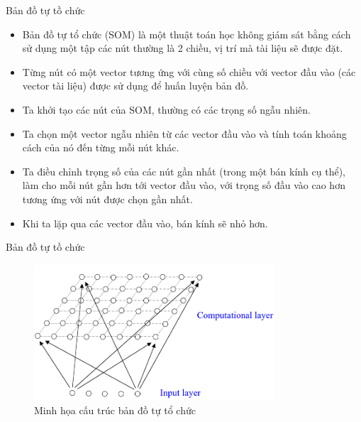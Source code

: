 \documentclass[10pt]{beamer}
\theoremstyle{remark}
\theoremstyle{definition}
\begin{document}
\begin{frame}{Bản đồ tự tồ chức}
	\begin{itemize}
		\item Bản đồ tự tổ chức (SOM) \cite{248} là một thuật toán học không giám sát bằng cách sử dụng một tập các nút thường là 2 chiều, vị trí mà tài liệu sẽ được đặt.
		\item Từng nút có một vector tương ứng với cùng số chiều với vector đầu vào (các vector tài liệu) được sử dụng để huấn luyện bản đồ.
		\item Ta khởi tạo các nút của SOM, thường có các trọng số ngẫu nhiên.
		\item Ta chọn một vector ngẫu nhiên từ các vector đầu vào và tính toán khoảng cách của nó đến từng mỗi nút khác.
		\item Ta điều chỉnh trọng số của các nút gần nhất (trong một bán kính cụ thể), làm cho mỗi nút gần hơn tới vector đầu vào,
		với trọng số đầu vào cao hơn tương ứng với nút được chọn gần nhất.
		\item Khi ta lặp qua các vector đầu vào, bán kính sẽ nhỏ hơn.
	\end{itemize}
\end{frame}

\begin{frame}{Bản đồ tự tồ chức}
	\begin{figure}[h!]
        \centering
        \includegraphics[width=0.8\textwidth]{Self-Organizing-Maps-Network.png}
        \caption{Minh họa cấu trúc bản đồ tự tổ chức}
        \label{fig:SOMs}
    \end{figure}
\end{frame}
\end{document}
